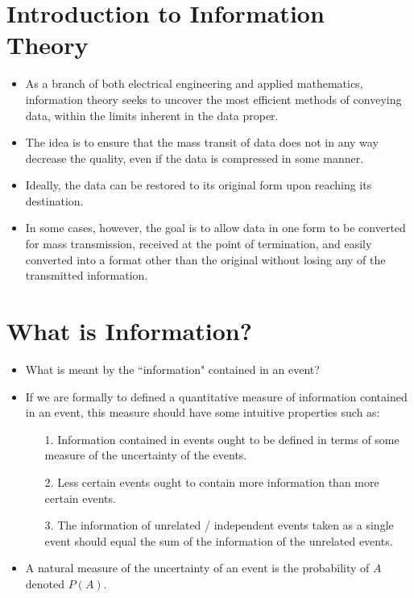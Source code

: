 \section{Introduction to Information Theory}
\begin{itemize}

\item As a branch of both electrical engineering and applied mathematics, information theory seeks to uncover the most efficient 
methods of conveying data, within the limits inherent in the data proper. \item The idea is to ensure that the mass transit of data does 
not in any way decrease the quality, even if the data is compressed in some manner. 
\end{itemize}


\begin{itemize}
\item Ideally, the data can be restored to its original form upon reaching its destination. 
\item In some cases, however, the goal is to allow data in one form to be converted for mass transmission, 
received at the point of termination, and easily converted into a format other than the original without losing any of the transmitted information.
\end{itemize}



\section{What is Information?}

\begin{itemize} \item  What is meant by the ``information" contained in an event?
\item If we are formally to defined a quantitative measure of information contained in an event, this measure should have some intuitive properties such as:
\begin{itemize} \item [1.] Information contained in events ought to be defined in terms of some measure of the uncertainty of the events.
\item [2.] Less certain events ought to contain more information than more certain events.
\item [3.] The information of unrelated / independent events taken as a single event should equal the sum of the information of the unrelated events.
\end{itemize}

\item A natural measure of the uncertainty of an event is the probability of $A$ denoted $P(A)$.
\end{itemize}

